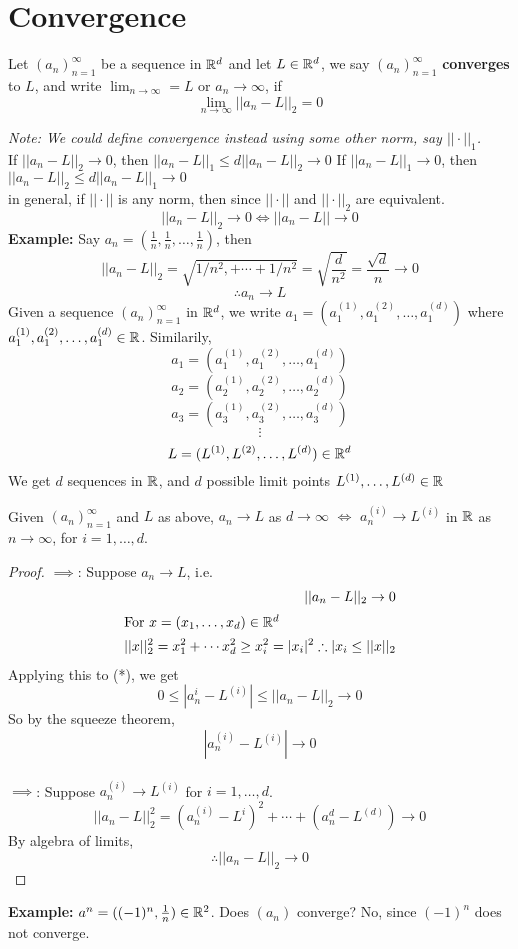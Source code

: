 \documentclass[openany]{report}
\begin{document}
\section{Convergence}
\begin{definition}
Let $(a_n)_{n=1}^\infty$ be a sequence in $\mathbb{R}^d$ and let $L \in \mathbb{R}^d$, we say $(a_n)_{n=1}^\infty$ \textbf{converges} to $L$, and write $\lim_{n \rightarrow \infty} = L$ or $a_n \rightarrow \infty$, if 
$$\lim_{n \rightarrow \infty} ||a_n - L||_2 = 0$$
\end{definition}
\textit{Note: We could define convergence instead using some other norm, say $||\cdot||_1$.}\\[2ex]
If $||a_n - L||_2 \rightarrow 0$, then $||a_n - L||_1 \leq d||a_n - L||_2 \rightarrow 0$
If $||a_n - L||_1 \rightarrow 0$, then $||a_n - L||_2 \leq d||a_n - L||_1 \rightarrow 0$\\[2ex]
in general, if $||\cdot||$ is any norm, then since $||\cdot||$ and $||\cdot||_2$ are equivalent.
$$||a_n - L||_2 \rightarrow 0 \iff ||a_n - L|| \rightarrow 0$$
\textbf{Example:} Say $a_n = \left(\frac{1}{n}, \frac{1}{n}, \dots, \frac{1}{n}\right)$, then 
$$||a_n - L||_2 = \sqrt{1/n^2, + \cdots + 1/n^2} = \sqrt{\frac{d}{n^2}} = \frac{\sqrt{d}}{n}\rightarrow 0$$
$$\therefore a_n \rightarrow L$$
Given a sequence $(a_n)_{n=1}^\infty$ in $\mathbb{R}^d$, we write $a_1 = (a_1^{(1)},a_1^{(2)}, \dots, a_1^{(d)})$ where $a_1^{(1)},a_1^{(2)}, \dots, a_1^{(d)} \in \mathbb{R}$. Similarily, 
$$a_1 = (a_1^{(1)},a_1^{(2)}, \dots, a_1^{(d)})$$
$$a_2 = (a_2^{(1)},a_2^{(2)}, \dots, a_2^{(d)})$$
$$a_3 = (a_3^{(1)},a_3^{(2)}, \dots, a_3^{(d)})$$
$$\vdots$$
$$L = (L^{(1)},L^{(2)}, \dots, L^{(d)}) \in \mathbb{R}^d$$
We get $d$ sequences in $\mathbb{R}$, and $d$ possible limit points $L^{(1)}, \dots, L^{(d)} \in \mathbb{R}$
\begin{prop}
Given $(a_n)_{n=1}^\infty$ and $L$ as above, $a_n \rightarrow L$ as $d \rightarrow \infty$ $\iff$ $a_n^{(i)} \rightarrow L^{(i)}$ in $\mathbb{R}$ as $n \rightarrow \infty$, for $i = 1, \dots, d$.
\end{prop}
\begin{proof}
$\implies$: Suppose $a_n \rightarrow L$, i.e.
\begin{align*}
    ||a_n - L||_2 \rightarrow 0\\
    \intertext{For $x = (x_1, \dots, x_d) \in \mathbb{R}^d$}
    ||x||^2_2 = x_1^2 + \cdots x_d^2 \geq x_i^2 = |x_i|^2
    \therefore |x_i \leq ||x||_2
\end{align*}
Applying this to (*), we get 
$$0 \leq |a_n^i - L^{(i)}| \leq ||a_n - L ||_2 \rightarrow 0$$
So by the squeeze theorem, 
$$|a_n^{(i)} - L^{(i)}| \rightarrow 0$$\\[2ex]
$\implies$: Suppose $a_n^{(i)} \rightarrow L^{(i)}$ for $i = 1, \dots, d$.
$$||a_n - L||^2_2 = (a_n^{(i)} - L^i)^2 + \cdots + (a_n^d - L^(d)) \rightarrow 0$$
By algebra of limits,
$$\therefore ||a_n - L||_2 \rightarrow 0$$
\end{proof}
\textbf{Example:} $a^n = ((-1)^n, \frac{1}{n}) \in \mathbb{R}^2$. Does $(a_n)$ converge? No, since $(-1)^n$ does not converge.
\end{document}
